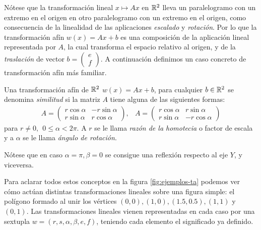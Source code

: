 Nótese que la transformación lineal $x\mapsto Ax$ en $\mathbb{R}^2$ lleva un paralelogramo con un extremo en el origen en otro paralelogramo con un extremo en el origen, como consecuencia de la linealidad de las aplicaciones \textit{escalado} y \textit{rotación}. Por lo que la transformación afín $w(x)=Ax+b$ es una composición de la aplicación lineal representada por $A$, la cual transforma el espacio relativo al origen, y de la \textit{traslación} de vector $b=\begin{pmatrix} e \\ f\end{pmatrix}$. A continuación definimos un caso concreto de transformación afín más familiar.

\begin{definicion}
    Una transformación afín de $\mathbb{R}^2$ $w(x)=Ax+b$, para cualquier $b\in\mathbb{R}^2$ se denomina \textit{similitud} si la matriz $A$ tiene alguna de las siguientes formas:
    \begin{eqnarray}
        A = \begin{pmatrix}
            r\cos\alpha & -r\sin\alpha \\
            r\sin\alpha & r\cos\alpha
        \end{pmatrix}
        , &
        A = \begin{pmatrix}
            r\cos\alpha & r\sin\alpha \\
            r\sin\alpha & -r\cos\alpha
        \end{pmatrix}
    \end{eqnarray}
    para $r\not= 0,\ \ 0\leq\alpha<2\pi$. A $r$ se le llama \textit{razón de la homotecia} o factor de escala y a $\alpha$ se le llama \textit{ángulo de rotación}.
\end{definicion}

Nótese que en caso $\alpha=\pi,\beta=0$ se consigue una reflexión respecto al eje $Y$, y viceversa.

Para aclarar todos estos conceptos en la figura \ref{fig:ejemplos-ta} podemos ver cómo actúan distintas transformaciones lineales sobre una figura simple: el polígono formado al unir los vértices $(0,0), (1,0), (1.5, 0.5), (1,1)$ y $(0,1)$. Las transformaciones lineales vienen representadas en cada caso por una sextupla $w=(r,s,\alpha,\beta,e,f)$, teniendo cada elemento el significado ya definido.

